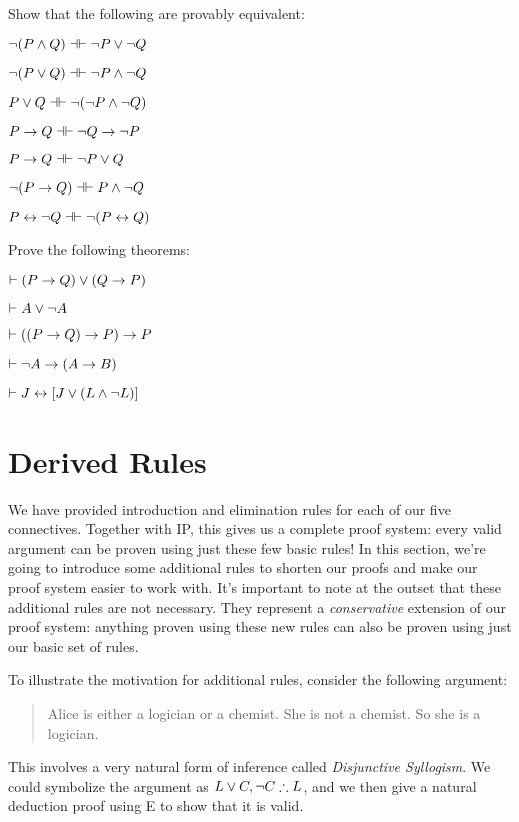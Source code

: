 \problempart
Show that the following are provably equivalent:
\begin{earg}
\item $\enot (P \eand Q) \pequiv \enot P \eor \enot Q$
\item $\enot (P \eor Q) \pequiv \enot P \eand \enot Q$
\item $P \eor Q \pequiv \enot (\enot P \eand \enot Q)$
\item $P \eif Q \pequiv \enot Q \eif \enot P$
\item $P \eif Q \pequiv \enot P \eor Q$
\item $\enot (P \eif Q) \pequiv P \eand \enot Q$
\item $P \eiff \enot Q \pequiv \enot(P \eiff Q)$
\end{earg}

\problempart
Prove the following theorems:

\begin{earg}
\item $\vdash (P \rightarrow Q) \vee (Q \rightarrow P)$
\item $\vdash A \vee \neg A$ %
\item $\vdash ((P \rightarrow Q) \rightarrow P) \rightarrow P$ %
\item $\vdash \neg A \rightarrow (A \rightarrow B)$
\item $\vdash J \leftrightarrow [J\vee (L\wedge\neg L)]$
\end{earg}



\section{Derived Rules}\label{s:TFLDerivedRules}

We have provided introduction and elimination rules for each of our five connectives.  Together with IP, this gives us a complete proof system: every valid argument can be proven using just these few basic rules!  In this section, we're going to introduce some additional rules to shorten our proofs and make our proof system easier to work with.  It's important to note at the outset that these additional rules are not necessary.  They represent a \emph{conservative} extension of our proof system: anything proven using these new rules can also be proven using just our basic set of rules.

To illustrate the motivation for additional rules, consider the following argument:
	\begin{quote}
		Alice is either a logician or a chemist. She is not a chemist.  So she is a logician.
	\end{quote}
This involves a very natural form of inference called \emph{Disjunctive Syllogism}.  We could symbolize the argument as $L\vee C, \neg C \therefore L$, and we then give a natural deduction proof using \eor E to show that it is valid.

